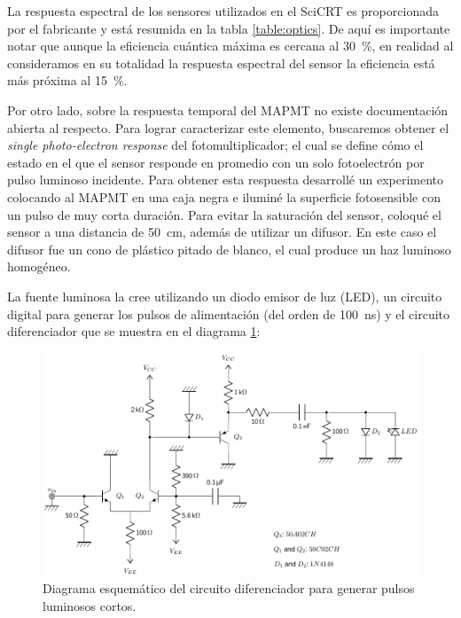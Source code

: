 La respuesta espectral de los sensores utilizados en el SciCRT es proporcionada por el fabricante y está resumida en la tabla \ref{table:optics}. De aquí es importante notar que aunque la eficiencia cuántica máxima es cercana al \SI{30}{\percent}, en realidad al consideramos en su totalidad la respuesta espectral del sensor la eficiencia está más próxima al \SI{15}{\percent}.

Por otro lado, sobre la respuesta temporal del MAPMT no existe documentación abierta al respecto. Para lograr caracterizar este elemento, buscaremos obtener el \emph{single photo-electron response} del fotomultiplicador; el cual se define cómo el estado en el que el sensor responde en promedio con un solo fotoelectrón por pulso luminoso incidente. Para obtener esta respuesta desarrollé un experimento colocando al MAPMT en una caja negra e iluminé la superficie fotosensible con un pulso de muy corta duración. Para evitar la saturación del sensor, coloqué el sensor a una distancia de \SI{50}{\cm}, además de utilizar un difusor. En este caso el difusor fue un cono de plástico pitado de blanco, el cual produce un haz luminoso homogéneo.

La fuente luminosa la cree utilizando un diodo emisor de luz (LED), un circuito digital para generar los pulsos de alimentación (del orden de \SI{100}{\nano\second}) y el circuito diferenciador que se muestra en el diagrama \ref{fig:led-driver}:

\begin{figure}
        \centering
        \includegraphics[width=\textwidth]{led-driver.pdf}
        \caption{Diagrama esquemático del circuito diferenciador para generar pulsos luminosos cortos.}
        \label{fig:led-driver}
\end{figure}

